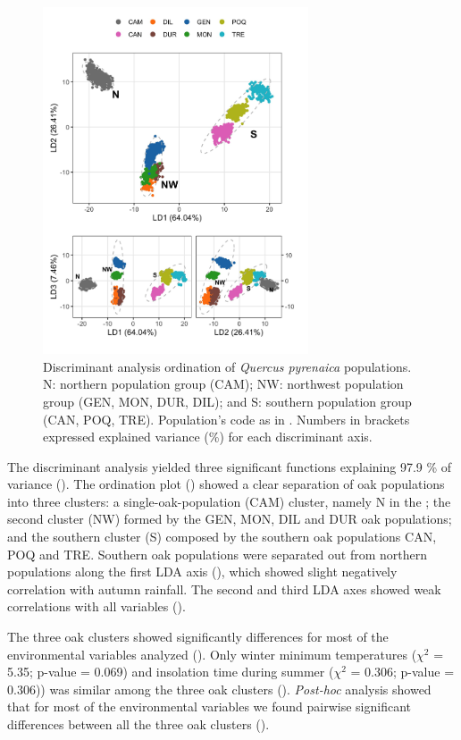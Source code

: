 \begin{figure}
\centering
\includegraphics[width=0.7\textwidth]{img/multivariante/lda_biplotsv2} \caption{Discriminant analysis ordination of \textit{Quercus pyrenaica} populations. N: northern population group (CAM); NW: northwest population group (GEN, MON, DUR, DIL); and S: southern population group (CAN, POQ, TRE). Population's code as in  . Numbers in brackets expressed explained variance (\%) for each discriminant axis.} \label{fig:lda}
\end{figure}

The discriminant analysis yielded three significant functions explaining 97.9 \% of variance (). The ordination plot () showed a clear separation of oak populations into three clusters: a single-oak-population (CAM) cluster, namely N in the ; the second cluster (NW) formed by the GEN, MON, DIL and DUR oak populations; and the southern cluster (S) composed by the southern oak populations CAN, POQ and TRE. Southern oak populations were separated out from northern populations along the first LDA axis (), which showed slight negatively correlation with autumn rainfall. The second and third LDA axes showed weak correlations with all variables ().

The three oak clusters showed significantly differences for most of the environmental variables analyzed (). Only winter minimum temperatures (\(\chi^2\) = 5.35; p-value = 0.069) and insolation time during summer (\(\chi^2\) = 0.306; p-value = 0.306)) was similar among the three oak clusters (). \emph{Post-hoc} analysis showed that for most of the environmental variables we found pairwise significant differences between all the three oak clusters ().

